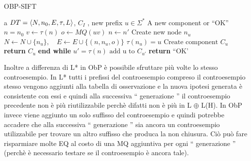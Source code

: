 \begin{algorithm}
\caption{OBP-SIFT}\label{alg:sift}
\begin{algorithmic}[1]
\Statex
\Input a $DT=\Braket{N,n_0,E,\tau,L}$, $C_I$ , new prefix $u \in \Sigma^{*}$   
\Output A new component or  ``OK''
\State $n=n_0$
     \State $v \gets \tau(n)$
     \State $o \gets MQ(uv)$ 
      
     \State $n \gets n'$
     \Else {}
     \State Create new node $n_u$
     \State $N \gets N \cup \{n_u\},\quad E \gets E \cup \{(n,n_u,o)\}$
     \State $\tau(n_u)=u$
     \State $\text{Create component }  C_u$ 
     \State \textbf{return} $C_u$
     \EndIf  
     \EndWhile
      \State \textbf{end while}
     \State $u'=\tau(n)$ 
     \State $\text{add u to } C_{u'}$ 
    \State \textbf{return} ``OK'
\end{algorithmic}
\end{algorithm}

Inoltre a differenza di L* in \ac{ObP} è possibile sfruttare più volte lo stesso controesempio. In L* tutti i prefissi del controesempio  compreso il controesempio stesso vengono aggiunti alla tabella di osservazione e la nuova ipotesi generata è consistente con essi e quindi alla successiva `` generazione  '' il controesempio precedente non è più riutilizzabile perchè difatti non è più in \ac{L} $\oplus$ L(\ac{H}). In \ac{ObP} invece viene aggiunto un solo suffisso del controesempio e quindi potrebbe accadere che alla successiva `` generazione  '' sia ancora un controesempio utilizzabile per trovare un altro suffisso che produca la non chiusura. Ciò può fare risparmiare molte \ac{EQ} al costo di una \ac{MQ} aggiuntiva per ogni `` generazione  '' (perchè è necessario testare se il controesempio è ancora tale).

